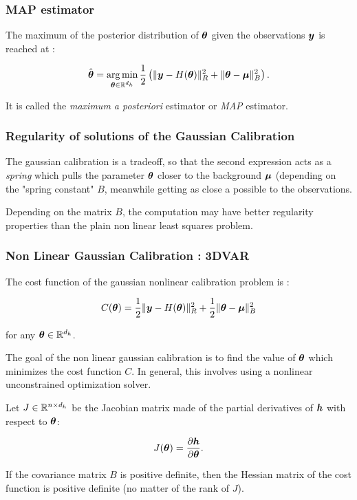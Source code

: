 \documentclass{beamer}
\begin{document}
\begin{frame}
\frametitle{MAP estimator}

The maximum of the posterior distribution of $\boldsymbol{\theta}$ given
the observations $\boldsymbol{y}$ is reached at :

$$
   \hat{\boldsymbol{\theta}} = \operatorname*{arg\,min}_{\boldsymbol{\theta}\in\mathbb{R}^{d_h}} \frac{1}{2} \left( \|\boldsymbol{y} - H(\boldsymbol{\theta})\|^2_R 
   + \|\boldsymbol{\theta}-\boldsymbol{\mu} \|^2_B \right).
$$

It is called the \emph{maximum a posteriori} estimator or \emph{MAP}
estimator.
\end{frame}

\begin{frame}
\frametitle{Regularity of solutions of the Gaussian Calibration}

The gaussian calibration is a tradeoff, so that the second expression
acts as a \emph{spring} which pulls the parameter $\boldsymbol{\theta}$
closer to the background $\boldsymbol{\mu}$ (depending on the "spring
constant" $B$, meanwhile getting as close a possible to the
observations. 

Depending on the matrix $B$, the computation may
have better regularity properties than the plain non linear least
squares problem.
\end{frame}

\begin{frame}
\frametitle{Non Linear Gaussian Calibration : 3DVAR}

The cost function of the gaussian nonlinear calibration problem is :

$$
   C(\boldsymbol{\theta}) = \frac{1}{2}\|\boldsymbol{y}-H(\boldsymbol{\theta})\|^2_R 
   + \frac{1}{2}\|\boldsymbol{\theta}-\boldsymbol{\mu} \|^2_B
$$

for any $\boldsymbol{\theta}\in\mathbb{R}^{d_h}$.

The goal of the non linear gaussian calibration is to find the value of
$\boldsymbol{\theta}$ which minimizes the cost function $C$. In
general, this involves using a nonlinear unconstrained optimization
solver.

Let $J \in \mathbb{R}^{n \times d_h}$ be the Jacobian matrix made of
the partial derivatives of $\boldsymbol{h}$ with respect to
$\boldsymbol{\theta}$:

$$
J(\boldsymbol{\theta}) = \frac{\partial \boldsymbol{h}}{\partial \boldsymbol{\theta}}.
$$

If the covariance matrix $B$ is positive definite, then the
Hessian matrix of the cost function is positive definite 
(no matter of the rank of $J$). 

\end{frame}
\end{document}
